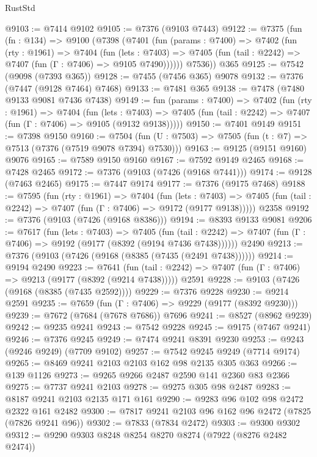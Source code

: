 \begin{lexlean}{RustStd}
\begin{coremodule}
@9103 := @7414 @9102
@9105 := @7376 (@9103 @7443)
@9122 := @7375
    (fun (fn : @134) =>
    @9100
      (@7398
        (@7401
          (fun (params : @7400) =>
          @7402
            (fun (rty : @1961) =>
            @7404
              (fun (lets : @7403) =>
              @7405 (fun (tail : @2242) => @7407 (fun (Γ : @7406) => @9105 @7490))))))
        @7536))
    @365
@9125 := @7542 (@9098 (@7393 @365))
@9128 := @7455 (@7456 @365) @9078
@9132 := @7376 (@7447 (@9128 @7464) @7468)
@9133 := @7481 @365
@9138 := @7478 (@7480 @9133 @9081 @7436 @7438)
@9149 := fun (params : @7400) =>
  @7402
    (fun (rty : @1961) =>
    @7404
      (fun (lets : @7403) =>
      @7405 (fun (tail : @2242) => @7407 (fun (Γ : @7406) => @9105 (@9132 @9138)))))
@9150 := @7401 @9149
@9151 := @7398 @9150
@9160 := @7504 (fun (U : @7503) => @7505 (fun (t : @7) => @7513 (@7376 (@7519 @9078 @7394) @7530)))
@9163 := @9125 (@9151 @9160) @9076
@9165 := @7589 @9150 @9160
@9167 := @7592 @9149 @2465
@9168 := @7428 @2465
@9172 := @7376 (@9103 (@7426 (@9168 @7441)))
@9174 := @9128 (@7463 @2465)
@9175 := @7447 @9174
@9177 := @7376 (@9175 @7468)
@9188 := @7595
    (fun (rty : @1961) =>
    @7404
      (fun (lets : @7403) =>
      @7405 (fun (tail : @2242) => @7407 (fun (Γ : @7406) => @9172 (@9177 @9138)))))
    @2358
@9192 := @7376 (@9103 (@7426 (@9168 @8386)))
@9194 := @8393 @9133 @9081
@9206 := @7617
    (fun (lets : @7403) =>
    @7405
      (fun (tail : @2242) => @7407 (fun (Γ : @7406) => @9192 (@9177 (@8392 (@9194 @7436 @7438))))))
    @2490
@9213 := @7376 (@9103 (@7426 (@9168 (@8385 (@7435 (@2491 @7438))))))
@9214 := @9194 @2490
@9223 := @7641
    (fun (tail : @2242) => @7407 (fun (Γ : @7406) => @9213 (@9177 (@8392 (@9214 @7438)))))
    @2591
@9228 := @9103 (@7426 (@9168 (@8385 (@7435 @2592))))
@9229 := @7376 @9228
@9230 := @9214 @2591
@9235 := @7659 (fun (Γ : @7406) => @9229 (@9177 (@8392 @9230)))
@9239 := @7672 (@7684 (@7678 @7686)) @7696
@9241 := @8527 (@8962 @9239)
@9242 := @9235 @9241
@9243 := @7542 @9228
@9245 := @9175 (@7467 @9241)
@9246 := @7376 @9245
@9249 := @7474 @9241 @8391 @9230
@9253 := @9243 (@9246 @9249) (@7709 @9102)
@9257 := @7542 @9245 @9249 (@7714 @9174)
@9265 := @8469 @9241 @2103 @2103 @162 @98 @2135 @305 @363
@9266 := @139 @1126
@9273 := @9265 @9266 @2487 @2590 @141 @2360 @83 @2366
@9275 := @7737 @9241 @2103
@9278 := @9275 @305 @98 @2487
@9283 := @8187 @9241 @2103 @2135 @171 @161
@9290 := @9283 @96 @102 @98 @2472 @2322 @161 @2482
@9300 := @7817 @9241 @2103 @96 @162 @96 @2472 (@7825 (@7826 @9241 @96))
@9302 := @7833 (@7834 @2472)
@9303 := @9300 @9302
@9312 := @9290 @9303 @8248 @8254 @8270 @8274 (@7922 (@8276 @2482 @2474))

\end{coremodule}
\end{lexlean}
